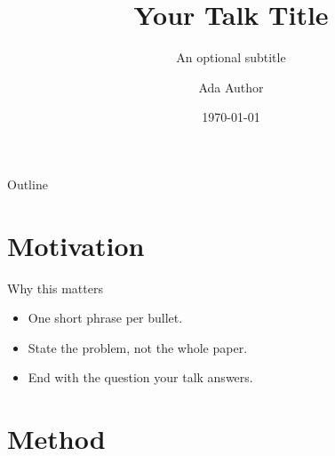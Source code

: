\documentclass[aspectratio=169]{beamer}  %
\title[Short Title]{Your Talk Title}
\subtitle{An optional subtitle}
\author[A.~Author]{Ada Author}
\institute[Inst.]{Your Lab / Institution}
\date{\today}
\begin{document}
\begin{frame}[plain]
  \titlepage
\end{frame}

\begin{frame}{Outline}
  \tableofcontents
\end{frame}

\section{Motivation}
\begin{frame}{Why this matters}
  \begin{itemize}
    \item One short phrase per bullet.
    \item State the problem, not the whole paper.
    \item End with the question your talk answers.
  \end{itemize}
\end{frame}

\section{Method}
\end{document}
